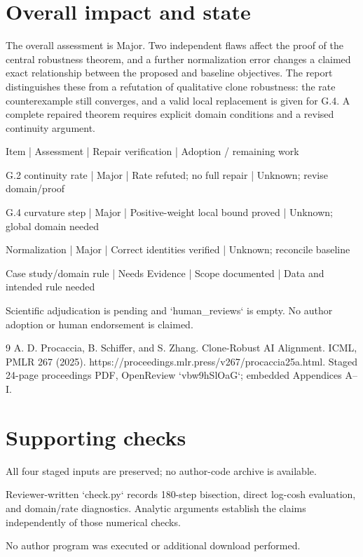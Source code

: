 \documentclass[10pt]{article}
\begin{document}
\section*{Overall impact and state}
The overall assessment is Major. Two independent flaws affect the proof of the central robustness theorem, and a further normalization error changes a claimed exact relationship between the proposed and baseline objectives. The report distinguishes these from a refutation of qualitative clone robustness: the rate counterexample still converges, and a valid local replacement is given for G.4. A complete repaired theorem requires explicit domain conditions and a revised continuity argument.\par
Item | Assessment | Repair verification | Adoption / remaining work\par
G.2 continuity rate | Major | Rate refuted; no full repair | Unknown; revise domain/proof\par
G.4 curvature step | Major | Positive-weight local bound proved | Unknown; global domain needed\par
Normalization | Major | Correct identities verified | Unknown; reconcile baseline\par
Case study/domain rule | Needs Evidence | Scope documented | Data and intended rule needed\par
Scientific adjudication is pending and `human\_reviews` is empty. No author adoption or human endorsement is claimed.\par
9 A. D. Procaccia, B. Schiffer, and S. Zhang. Clone-Robust AI Alignment. ICML, PMLR 267 (2025). https://proceedings.mlr.press/v267/procaccia25a.html. Staged 24-page proceedings PDF, OpenReview `vbw9hSlOaG`; embedded Appendices A–I.\par
\section*{Supporting checks}
All four staged inputs are preserved; no author-code archive is available.\par
Reviewer-written `check.py` records 180-step bisection, direct log-cosh evaluation, and domain/rate diagnostics. Analytic arguments establish the claims independently of those numerical checks.\par
No author program was executed or additional download performed.\par
\end{document}
